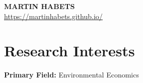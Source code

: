 \documentclass[11pt]{article}
\begin{document}

\begin{center}
    \textbf{\Large \textbf{MARTIN HABETS}} \\ \vspace{2pt} %
    \href{https://martinhabets.github.io/}{https://martinhabets.github.io/} \
\end{center}



\begin{comment}
This CV was written for specifically for positions I was applying for in
academia, and then modified to be a template.

A standard CV is about two pages long where as a resume in the US is one page.
sections can be added and removed here with this in mind. In my experience, 
education, and applicable work experience and skills are the most import things
to include on a resume. For a CV the Europass CV suggests the categories: Work
Experience, Education and Training, Language Skills, Digital Skills,
Communication and Interpersonal Skills, Conferences and Seminars, Creative Works
Driver's License, Hobbies and Interests, Honors and Awards, Management and
Leadership Skills, Networks and Memberships, Organizational Skills, Projects,
Publications, Recommendations, Social and Political Activities, Volunteering.

Your goal is to convey a who, what , when, where, why for every item you share. 
The who is obviously you, but I believe the rest should be done in that order.
For example below. An employer cares most about the degree held and typically 
less about the institution or where it is located (This is still good 
information though). Whatever order you choose be consistent throughout.
\end{comment}


\section{Research Interests}
 \begin{itemize}[leftmargin=0.5cm, label={}]
    \small{\item{
     \textbf{Primary Field: }{Environmental Economics} 
    }}
 \end{itemize}
\end{document}
